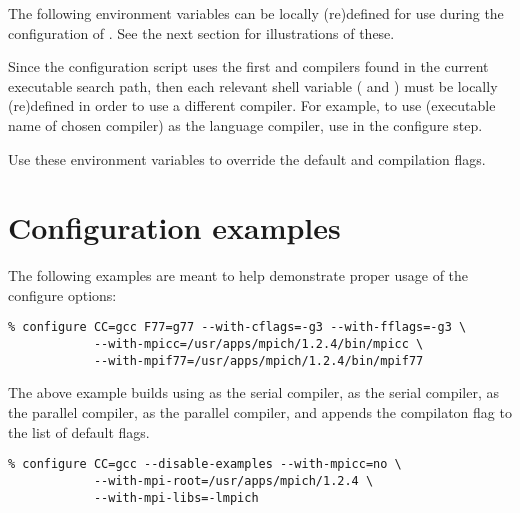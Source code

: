 
\noindent The following environment variables can be locally (re)defined for use 
during the configuration of {\sundials}. See the next section for illustrations of these.

\begin{config}

\item {}

\item {}

  Since the configuration script uses the first {\C} and {\F} compilers found in
  the current executable search path, then each relevant shell variable (
  and ) must be locally (re)defined in order to use a different compiler. 
  For example, to use  (executable name of chosen compiler) as the {\C}
  language compiler, use  in the configure step.

\item {}

\item {}

  Use these environment variables to override the default {\C} and {\F}
  compilation flags.

\end{config}



\section{Configuration examples}

The following examples are meant to help demonstrate proper usage of the configure options:

\begin{verbatim}
% configure CC=gcc F77=g77 --with-cflags=-g3 --with-fflags=-g3 \
            --with-mpicc=/usr/apps/mpich/1.2.4/bin/mpicc \ 
            --with-mpif77=/usr/apps/mpich/1.2.4/bin/mpif77
\end{verbatim}

\noindent The above example builds {\sundials} using  as the serial {\C}
compiler, \id{g77} as the serial {\F} compiler, \id{mpicc} as the parallel {\C}
compiler, \id{mpif77} as the parallel {\F} compiler, and appends the \id{-g3}
compilaton flag to the list of default flags.

\begin{verbatim}
% configure CC=gcc --disable-examples --with-mpicc=no \
            --with-mpi-root=/usr/apps/mpich/1.2.4 \
            --with-mpi-libs=-lmpich
\end{verbatim}


